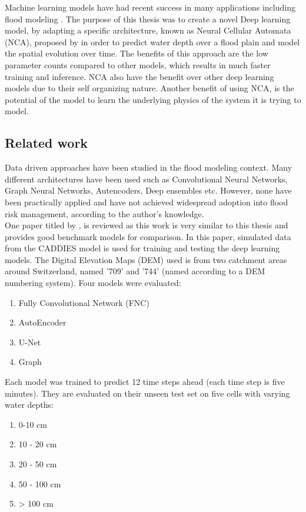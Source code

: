 Machine learning models have had recent success in many applications including flood modeling \cite{russo2023evaluation, karim2023review, chaudhary2022flood}. The purpose of this thesis was to create a novel Deep learning model, by adapting a specific architecture, known as Neural Cellular Automata (NCA), proposed by \citeauthor{growing_nca} \cite{growing_nca} in order to predict water depth over a flood plain and model the spatial evolution over time. The benefits of this approach are the low parameter counts compared to other models, which results in much faster training and inference. NCA also have the benefit over other deep learning models due to their self organizing nature. Another benefit of using NCA, is the potential of the model to learn the underlying physics of the system it is trying to model.

\subsection{Related work}
Data driven approaches have been studied in the flood modeling context. Many different architectures have been used such as Convolutional Neural Networks, Graph Neural Networks, Autencoders, Deep ensembles etc. However, none have been practically applied and have not achieved widespread adoption into flood risk management, according to the author's knowledge. \\

One paper titled  by  \citeauthor{russo2023evaluation} \cite{russo2023evaluation}, is reviewed as this work is very similar to this thesis and provides good benchmark models for comparison. In this paper, simulated data from the CADDIES  model is used for training and testing the deep learning models. The Digital Elevation Maps (DEM) used is from two catchment areas around Switzerland, named '709' and '744' (named according to a DEM numbering system). Four models were evaluated:
\begin{enumerate}
	\item Fully Convolutional Network (FNC)
	\item AutoEncoder
	\item U-Net
	\item Graph
\end{enumerate}

Each model was trained to predict 12 time steps ahead (each time step is five minutes). They are evaluated on their unseen test set on five cells with varying water depths:
\begin{enumerate}
	\item 0-10 cm
	\item 10 - 20 cm
	\item 20 - 50 cm
	\item 50 - 100 cm
	\item > 100 cm
\end{enumerate} 

